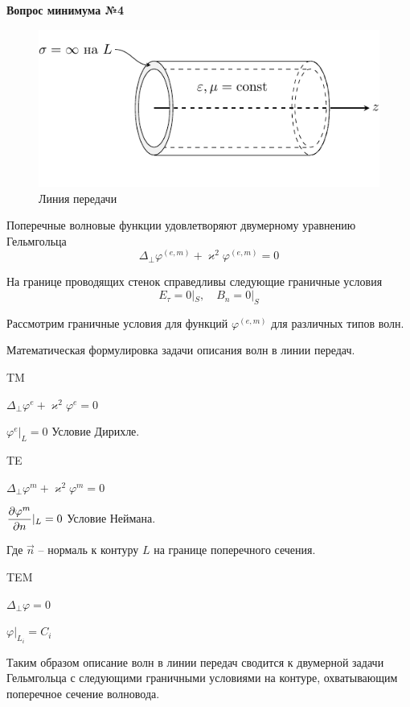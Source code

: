 \documentclass[a4paper,14pt]{extarticle}
\renewcommand{\phi}{\varphi}
\renewcommand{\kappa}{\varkappa}
\newcommand{\ticket}[1] {
\newpage
\hypertarget{num#1}{}
\begin{center}
	\textbf{Вопрос минимума №#1 }
\end{center}
}
\begin{document}
\ticket{4}
\begin{figure}[h!]
	\centering
	\includegraphics[scale=1.5]{img/lect2_ris1}
	\caption{Линия передачи}
	\label{fig:wavegain:1}
\end{figure}
	Поперечные волновые функции удовлетворяют двумерному уравнению Гельмгольца
\begin{equation}
	\Delta_\perp\phi^{(e,m)}+\kappa^2\phi^{(e,m)}=0
\end{equation}
	
	На границе проводящих стенок справедливы следующие граничные условия
\begin{equation}
	E_\tau = 0 |_S, \quad B_n = 0 |_S
\end{equation}
	
	Рассмотрим граничные условия для функций $\phi^{(e,m)}$ для различных типов волн.
	
	Математическая формулировка задачи описания волн в линии передач.
	
	TM
	
	$\Delta_\perp\phi^{e}+\kappa^2\phi^{e}=0$
	
	$\phi^e|_L = 0$
	Условие Дирихле.
	\vspace{20pt}
	
	TE
	
	$\Delta_\perp\phi^{m}+\kappa^2\phi^{m}=0$
	
	$\displaystyle \pdv{\phi^m}{n}|_L = 0$
	Условие Неймана.
	
	Где $\vec{n}$ -- нормаль к контуру $L$ на границе поперечного сечения.
	\vspace{20pt}
	
	TEM
	
	$\Delta_\perp\phi=0$
	
	$\phi|_{L_i} = C_i$
	
	Таким образом описание волн в линии передач сводится к двумерной задачи Гельмгольца с следующими граничными условиями на контуре, охватывающим поперечное сечение волновода.
	
\end{document}
